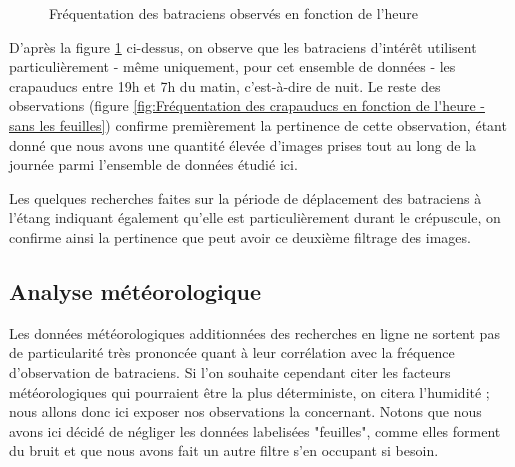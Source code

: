 \begin{figure}[H]
    \centering
    \caption{Fréquentation des batraciens observés en fonction de l'heure}
    \label{fig:Fréquentation des crapauducs en fonction de l'heure}
\end{figure}

\noindent D'après la figure \ref{fig:Fréquentation des crapauducs en fonction de l'heure} ci-dessus, on observe que les batraciens d'intérêt utilisent particulièrement - même uniquement, pour cet ensemble de données - les crapauducs entre 19h et 7h du matin, c'est-à-dire de nuit. Le reste des observations (figure \ref{fig:Fréquentation des crapauducs en fonction de l'heure - sans les feuilles}) confirme premièrement la pertinence de cette observation, étant donné que nous avons une quantité élevée d'images prises tout au long de la journée parmi l'ensemble de données étudié ici.\newline

Les quelques recherches faites sur la période de déplacement des batraciens à l'étang indiquant également qu'elle est particulièrement durant le crépuscule, on confirme ainsi la pertinence que peut avoir ce deuxième filtrage des images.


\subsection{Analyse météorologique}

Les données météorologiques additionnées des recherches en ligne ne sortent pas de particularité très prononcée quant à leur corrélation avec la fréquence d'observation de batraciens. Si l'on souhaite cependant citer les facteurs météorologiques qui pourraient être la plus déterministe, on citera l'humidité ; nous allons donc ici exposer nos observations la concernant. Notons que nous avons ici décidé de négliger les données labelisées "feuilles", comme elles forment du bruit et que nous avons fait un autre filtre s'en occupant si besoin.

